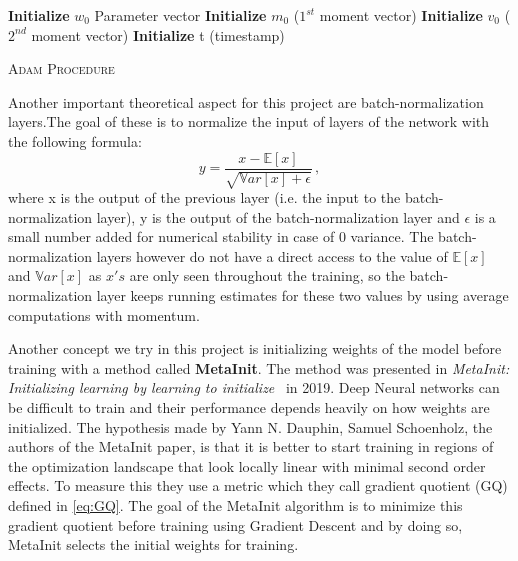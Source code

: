 \documentclass[a4paper,11pt,oneside]{report}
\begin{document}
\begin{algorithm}[H]
    \DontPrintSemicolon
    \SetAlgoNoLine
    
    \KwIn{learning rate $\eta$, exponential decay rates for the moment estimates $\beta_1, \beta_2 \in [0,1)$}
    \textbf{Initialize} $w_0$ Parameter vector\;
    \textbf{Initialize} $m_0$ ($1^{st}$ moment vector)\;
    \textbf{Initialize} $v_0$ ($2^{nd}$ moment vector)\;
    \textbf{Initialize} t (timestamp)\;
    \caption{{\textsc{Adam Procedure}}}
    \label{algo:Adam}
\end{algorithm}


Another important theoretical aspect for this project are batch-normalization layers.The goal of these is to normalize the input of layers of the network with the following formula:
\begin{equation}\label{eq:BN}
    y = \frac{x-\mathbb{E}[x]}{\sqrt{\mathbb{V}ar[x]+\epsilon}}\,,
\end{equation}
where x is the output of the previous layer (i.e. the input to the batch-normalization layer), y is the output of the batch-normalization layer and $\epsilon$ is a small number added for numerical stability in case of 0 variance. The batch-normalization layers however do not have a direct access to the value of $\mathbb{E}[x]$ and $\mathbb{V}ar[x]$ as $x's$ are only seen throughout the training, so the batch-normalization layer keeps running estimates for these two values by using average computations with momentum. 

Another concept we try in this project is initializing weights of the model before training with a method called \textbf{MetaInit}. The method was presented in \textit{MetaInit: Initializing learning by learning to initialize}~\cite{NEURIPS2019_876e8108} in 2019. Deep Neural networks can be difficult to train and their performance depends heavily on how weights are initialized. The hypothesis made by Yann N. Dauphin, Samuel Schoenholz, the authors of the MetaInit paper, is that it is better to start training in regions of the optimization landscape that look locally linear with minimal second order effects. To measure this they use a metric which they call gradient quotient (GQ) defined in \autoref{eq:GQ}. The goal of the MetaInit algorithm is to minimize this gradient quotient before training using Gradient Descent and by doing so, MetaInit selects the initial weights for training.
\end{document}
